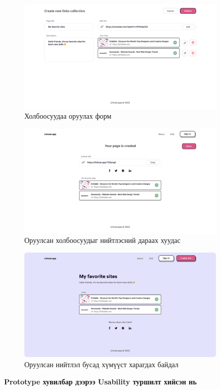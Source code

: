 \begin{figure}[h]
	\centering
	\includegraphics[width=10cm]{images/interfaces/v1/02-interface-createlink.png}
	\caption{Холбоосуудаа оруулах форм}
	\label{fig:interface-v1-02}
\end{figure}

\begin{figure}[h]
	\centering
	\includegraphics[width=10cm]{images/interfaces/v1/03-publis.png}
	\caption{Оруулсан холбоосуудыг нийтлэсний дараах хуудас}
	\label{fig:interface-v1-03}
\end{figure}

\begin{figure}[h]
	\centering
	\includegraphics[width=10cm]{images/interfaces/v1/04-link-list.png}
	\caption{Оруулсан нийтлэл бусад хүмүүст харагдах байдал}
	\label{fig:interface-v1-04}
\end{figure}

\clearpage
\textbf{Prototype хувилбар дээрээ Usability туршилт хийсэн нь}

